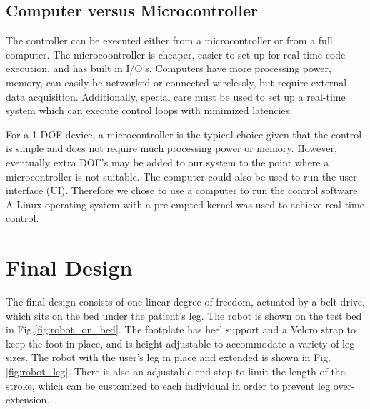 \documentclass[12pt]{report}
\begin{document}
	
	\subsection{Computer versus Microcontroller}
	
	The controller can be executed either from a microcontroller or from a full computer. The microcoontroller is cheaper, easier to set up for real-time code execution, and has built in I/O's. Computers have more processing power, memory, can easily be networked or connected wirelessly, but require external data acquisition. Additionally, special care must be used to set up a real-time system which can execute control loops with minimized latencies. 
	
	For a 1-DOF device, a microcontroller is the typical choice given that the control is simple and does not require much processing power or memory. However, eventually extra DOF's may be added to our system to the point where a microcontroller is not suitable. The computer could also be used to run the user interface (UI). Therefore we chose to use a computer to run the control software. A Linux operating system with a pre-empted kernel was used to achieve real-time control.



\section{Final Design} 

	The final design consists of one linear degree of freedom, actuated by a belt drive, which sits on the bed under the patient's leg. The robot is shown on the test bed in Fig.\ref{fig:robot_on_bed}. The footplate has heel support and a Velcro strap to keep the foot in place, and is height adjustable to accommodate a variety of leg sizes. The robot with the user's leg in place and extended is shown in Fig.\ref{fig:robot_leg}. There is also an adjustable end stop to limit the length of the stroke, which can be customized to each individual in order to prevent leg over-extension. 
\end{document}

